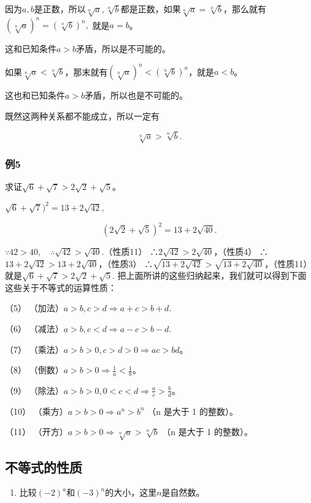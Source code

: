 因为\(a, b\)是正数，所以\(\sqrt[n]{a}, \sqrt[n]{b}\)都是正数，如果\(\sqrt[n]{a} = \sqrt[n]{b}\)，那么就有\((\sqrt[n]{a})^n = (\sqrt[n]{b})^n,\)
就是\(a=b\)。

这和已知条件\(a > b\)矛盾，所以是不可能的。

如果\(\sqrt[n]{a} < \sqrt[n]{b}\)，那末就有\((\sqrt[n]{a})^n < (\sqrt[n]{b})^n\)，就是\(a < b\)。

这也和已知条件\(a > b\)矛盾，所以也是不可能的。

既然这两种关系都不能成立，所以一定有

\[
\sqrt[n]{a} > \sqrt[n]{b}.
\]

\subsubsection{例5}

求证\(\sqrt{6} + \sqrt{7} > 2\sqrt{2} + \sqrt{5}\)。

 \(\sqrt{6} +\sqrt{7})^2 = 13 + 2\sqrt{42},\)

\[
(2 \sqrt{2} + \sqrt{5})^{2} = 13 + 2 \sqrt{40}.
\]

\(\because 42>40,\quad\therefore\sqrt{42}>\sqrt{40}.\)（性质11）
∴\(2\sqrt{42}>2\sqrt{40}\)，（性质4）
∴\(13+2\sqrt{42}>13+2\sqrt{40}\)，（性质3）
∴\(\sqrt{13+2\sqrt{42}}>\sqrt{13+2\sqrt{40}}\)，（性质11）
就是\(\sqrt{6} +\sqrt{7} >2\sqrt{2} +\sqrt{5}.\)
把上面所讲的这些归纳起来，我们就可以得到下面这些关于不等式的运算性质：

（5） （加法）\(a > b, c > d \Rightarrow a + c > b + d.\)

（6） （减法）\(a > b, c < d \Rightarrow a - c > b - d.\)

（7） （乘法）\(a > b > 0, c > d > 0 \Rightarrow ac>bd\)。

（8） （倒数）\(a > b > 0 \Rightarrow \frac{1}{a} < \frac{1}{b}\)。

（9）
（除法）\(a > b > 0, 0<c<d \Rightarrow \frac{a}{c} > \frac{b}{d}\)。

（10） （乘方）\(a > b > 0 \Rightarrow a^n > b^n\) （n 是大于 1
的整数）。

（11） （开方）\(a > b > 0 \Rightarrow \sqrt[n]{a} > \sqrt[n]{b}\) （n
是大于 1 的整数）。

\subsection{不等式的性质}

\begin{enumerate}
\item
  比较\((-2)^{a}\)和\((-3)^{n}\)的大小，这里\(n\)是自然数。
\end{enumerate}

